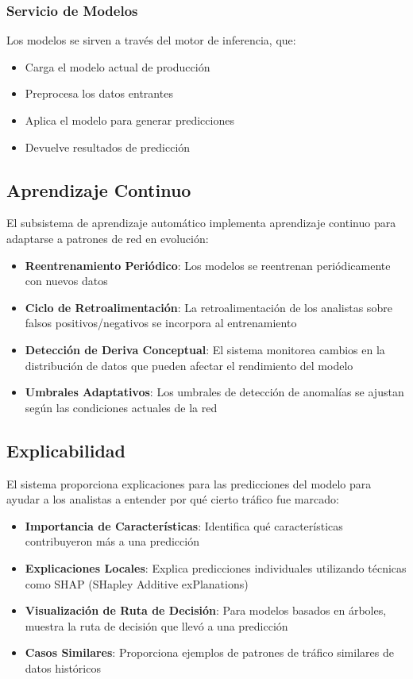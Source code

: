 \subsubsection{Servicio de Modelos}
Los modelos se sirven a través del motor de inferencia, que:

\begin{itemize}
    \item Carga el modelo actual de producción
    \item Preprocesa los datos entrantes
    \item Aplica el modelo para generar predicciones
    \item Devuelve resultados de predicción
\end{itemize}

\subsection{Aprendizaje Continuo}
El subsistema de aprendizaje automático implementa aprendizaje continuo para adaptarse a patrones de red en evolución:

\begin{itemize}
    \item \textbf{Reentrenamiento Periódico}: Los modelos se reentrenan periódicamente con nuevos datos
    \item \textbf{Ciclo de Retroalimentación}: La retroalimentación de los analistas sobre falsos positivos/negativos se incorpora al entrenamiento
    \item \textbf{Detección de Deriva Conceptual}: El sistema monitorea cambios en la distribución de datos que pueden afectar el rendimiento del modelo
    \item \textbf{Umbrales Adaptativos}: Los umbrales de detección de anomalías se ajustan según las condiciones actuales de la red
\end{itemize}

\subsection{Explicabilidad}
El sistema proporciona explicaciones para las predicciones del modelo para ayudar a los analistas a entender por qué cierto tráfico fue marcado:

\begin{itemize}
    \item \textbf{Importancia de Características}: Identifica qué características contribuyeron más a una predicción
    \item \textbf{Explicaciones Locales}: Explica predicciones individuales utilizando técnicas como SHAP (SHapley Additive exPlanations)
    \item \textbf{Visualización de Ruta de Decisión}: Para modelos basados en árboles, muestra la ruta de decisión que llevó a una predicción
    \item \textbf{Casos Similares}: Proporciona ejemplos de patrones de tráfico similares de datos históricos
\end{itemize}